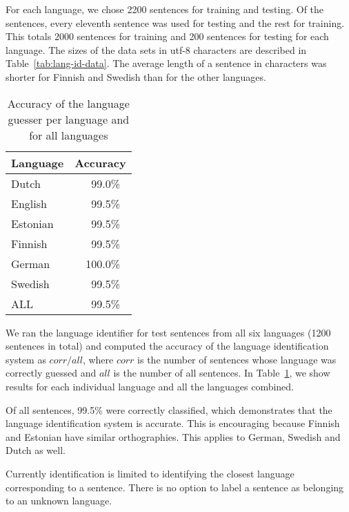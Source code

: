 \documentclass{llncs}
\begin{document}
For each language, we chose 2200 sentences for training and
testing. Of the sentences, every eleventh sentence was used for
testing and the rest for training. This totals 2000 sentences for
training and 200 sentences for testing for each language. The sizes of
the data sets in utf-8 characters are described in
Table~\ref{tab:lang-id-data}. The average length of a sentence in
characters was shorter for Finnish and Swedish than for the other
languages.

\begin{table}
\small
\begin{center}
\caption{Accuracy of the language guesser per language and for
  all languages}\label{tab:lang-id-acc}
\begin{tabular}{l|l}
Language & Accuracy\\
\hline
Dutch    & ~~~99.0\%\\
English  & ~~~99.5\%\\
Estonian & ~~~99.5\%\\
Finnish  & ~~~99.5\%\\
German   & ~~100.0\%\\
Swedish  & ~~~99.5\%\\
\hline
ALL      & ~~~99.5\%
\end{tabular}
\end{center}
\end{table}

We ran the language identifier for test sentences from all six
languages (1200 sentences in total) and computed the accuracy of the
language identification system as $corr / all$, where $corr$ is
the number of sentences whose language was correctly guessed and $all$
is the number of all sentences. In Table~\ref{tab:lang-id-acc}, we
show results for each individual language and all the languages
combined. 

Of all sentences, 99.5\% were correctly classified, which demonstrates
that the language identification system is accurate. This is
encouraging because Finnish and Estonian have similar
orthographies. This applies to German, Swedish and Dutch as well.

Currently identification is limited to identifying the closest
language corresponding to a sentence. There is no option to label a
sentence as belonging to an unknown language. 

\end{document}
